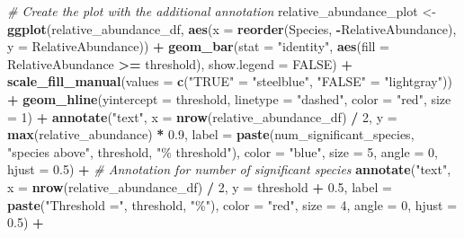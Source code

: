 \documentclass[
]{article}
\newenvironment{Shaded}{\begin{snugshade}}{\end{snugshade}}
\newcommand{\AttributeTok}[1]{\textcolor[rgb]{0.13,0.29,0.53}{#1}}
\newcommand{\CommentTok}[1]{\textcolor[rgb]{0.56,0.35,0.01}{\textit{#1}}}
\newcommand{\ConstantTok}[1]{\textcolor[rgb]{0.56,0.35,0.01}{#1}}
\newcommand{\DecValTok}[1]{\textcolor[rgb]{0.00,0.00,0.81}{#1}}
\newcommand{\FloatTok}[1]{\textcolor[rgb]{0.00,0.00,0.81}{#1}}
\newcommand{\FunctionTok}[1]{\textcolor[rgb]{0.13,0.29,0.53}{\textbf{#1}}}
\newcommand{\NormalTok}[1]{#1}
\newcommand{\OtherTok}[1]{\textcolor[rgb]{0.56,0.35,0.01}{#1}}
\newcommand{\SpecialCharTok}[1]{\textcolor[rgb]{0.81,0.36,0.00}{\textbf{#1}}}
\newcommand{\StringTok}[1]{\textcolor[rgb]{0.31,0.60,0.02}{#1}}
\begin{document}
\begin{Shaded}
\begin{Highlighting}[]
\CommentTok{\# Create the plot with the additional annotation}
\NormalTok{relative\_abundance\_plot }\OtherTok{\textless{}{-}} \FunctionTok{ggplot}\NormalTok{(relative\_abundance\_df, }\FunctionTok{aes}\NormalTok{(}\AttributeTok{x =} \FunctionTok{reorder}\NormalTok{(Species, }\SpecialCharTok{{-}}\NormalTok{RelativeAbundance), }\AttributeTok{y =}\NormalTok{ RelativeAbundance)) }\SpecialCharTok{+}
  \FunctionTok{geom\_bar}\NormalTok{(}\AttributeTok{stat =} \StringTok{"identity"}\NormalTok{, }\FunctionTok{aes}\NormalTok{(}\AttributeTok{fill =}\NormalTok{ RelativeAbundance }\SpecialCharTok{\textgreater{}=}\NormalTok{ threshold), }\AttributeTok{show.legend =} \ConstantTok{FALSE}\NormalTok{) }\SpecialCharTok{+}
  \FunctionTok{scale\_fill\_manual}\NormalTok{(}\AttributeTok{values =} \FunctionTok{c}\NormalTok{(}\StringTok{"TRUE"} \OtherTok{=} \StringTok{"steelblue"}\NormalTok{, }\StringTok{"FALSE"} \OtherTok{=} \StringTok{"lightgray"}\NormalTok{)) }\SpecialCharTok{+}
  \FunctionTok{geom\_hline}\NormalTok{(}\AttributeTok{yintercept =}\NormalTok{ threshold, }\AttributeTok{linetype =} \StringTok{"dashed"}\NormalTok{, }\AttributeTok{color =} \StringTok{"red"}\NormalTok{, }\AttributeTok{size =} \DecValTok{1}\NormalTok{) }\SpecialCharTok{+}
  \FunctionTok{annotate}\NormalTok{(}\StringTok{"text"}\NormalTok{, }\AttributeTok{x =} \FunctionTok{nrow}\NormalTok{(relative\_abundance\_df) }\SpecialCharTok{/} \DecValTok{2}\NormalTok{, }\AttributeTok{y =} \FunctionTok{max}\NormalTok{(relative\_abundance) }\SpecialCharTok{*} \FloatTok{0.9}\NormalTok{,}
           \AttributeTok{label =} \FunctionTok{paste}\NormalTok{(num\_significant\_species, }\StringTok{"species above"}\NormalTok{, threshold, }\StringTok{"\% threshold"}\NormalTok{),}
           \AttributeTok{color =} \StringTok{"blue"}\NormalTok{, }\AttributeTok{size =} \DecValTok{5}\NormalTok{, }\AttributeTok{angle =} \DecValTok{0}\NormalTok{, }\AttributeTok{hjust =} \FloatTok{0.5}\NormalTok{) }\SpecialCharTok{+}  \CommentTok{\# Annotation for number of significant species}
  \FunctionTok{annotate}\NormalTok{(}\StringTok{"text"}\NormalTok{, }\AttributeTok{x =} \FunctionTok{nrow}\NormalTok{(relative\_abundance\_df) }\SpecialCharTok{/} \DecValTok{2}\NormalTok{, }\AttributeTok{y =}\NormalTok{ threshold }\SpecialCharTok{+} \FloatTok{0.5}\NormalTok{,}
           \AttributeTok{label =} \FunctionTok{paste}\NormalTok{(}\StringTok{"Threshold ="}\NormalTok{, threshold, }\StringTok{"\%"}\NormalTok{), }\AttributeTok{color =} \StringTok{"red"}\NormalTok{, }\AttributeTok{size =} \DecValTok{4}\NormalTok{, }\AttributeTok{angle =} \DecValTok{0}\NormalTok{, }\AttributeTok{hjust =} \FloatTok{0.5}\NormalTok{) }\SpecialCharTok{+}

\end{Highlighting}
\end{Shaded}
\end{document}
